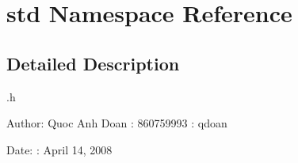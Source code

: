 \section{std Namespace Reference}
\label{namespacestd}




\subsection{Detailed Description}
.h \begin{Desc}
\item[Author:]Quoc Anh Doan : 860759993 : qdoan \end{Desc}
\begin{Desc}
\item[Date:]: April 14, 2008 \end{Desc}



